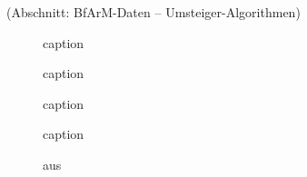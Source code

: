 (Abschnitt: BfArM-Daten -- Umsteiger-Algorithmen)

\begin{figure}[H]
    \centering\large%
    \resizebox{.99\textwidth}{!}{}
    \normalsize\caption{caption}
\end{figure}

\newpage


\begin{figure}[H]
    \centering\large%
    \resizebox{.99\textwidth}{!}{}
    \normalsize\caption{caption}
\end{figure}

\begin{figure}[H]
    \centering\large%
    \resizebox{.99\textwidth}{!}{}
    \normalsize\caption{caption}
\end{figure}

\newpage

\begin{figure}[H]
    \centering\LARGE%
    \resizebox{.60\textwidth}{!}{}
    \normalsize\caption{caption}
\end{figure}

\newpage

\begin{figure}[H]
    \centering
    \setlength{\fboxsep}{10pt}\color{black!20}
    \normalcolor\caption{aus \citep[Seite 172]{gross2013handbook}}
\end{figure}

